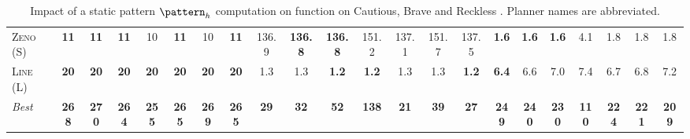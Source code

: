 \begin{table}[tb]
{\begin{tabular}{|l||ccccccc||ccccccc||ccccccc||}
\textsc{Zeno} (S)&\textbf{11}&\textbf{11}&\textbf{11}&10&\textbf{11}&10&\textbf{11}&136.9&\textbf{136.8}&\textbf{136.8}&151.2&137.1&151.7&137.5&\textbf{1.6}&\textbf{1.6}&\textbf{1.6}&4.1&1.8&1.8&1.8\\
\textsc{Line} (L)&\textbf{20}&\textbf{20}&\textbf{20}&\textbf{20}&\textbf{20}&\textbf{20}&\textbf{20}&1.3&1.3&\textbf{1.2}&\textbf{1.2}&1.3&1.3&\textbf{1.2}&\textbf{6.4}&6.6&7.0&7.4&6.7&6.8&7.2
\\\hline
\textit{Best}&\textbf{268}&\textbf{270}&\textbf{264}&\textbf{255}&\textbf{265}&\textbf{269}&\textbf{265}&\textbf{29}&\textbf{32}&\textbf{52}&\textbf{138}&\textbf{21}&\textbf{39}&\textbf{27}&\textbf{249}&\textbf{240}&\textbf{230}&\textbf{110}&\textbf{224}&\textbf{221}&\textbf{209}\\\hline

        \end{tabular}}
        \caption{Impact of a static pattern $\pattern_h$ computation on function on Cautious, Brave and Reckless \pattyd. Planner names are abbreviated.}
        \label{tab:abl-patternh-static}
        \end{table}
        